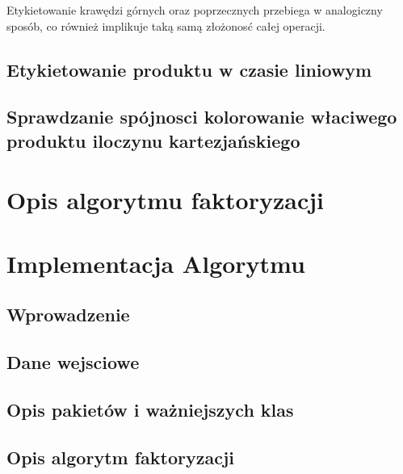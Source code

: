 \documentclass[12pt,a4paper,titlepage]{article}
\begin{document}
\begin{enumerate}
Etykietowanie krawędzi górnych oraz poprzecznych przebiega w analogiczny sposób, co również implikuje taką samą złożonosć całej operacji.\\
\end{enumerate}

\subsection{Etykietowanie produktu w czasie liniowym}
\subsection{Sprawdzanie spójnosci kolorowanie właciwego produktu iloczynu kartezjańskiego}
\section{Opis algorytmu faktoryzacji}
\section{Implementacja Algorytmu}
\subsection{Wprowadzenie}
\subsection{Dane wejsciowe}
\subsection{Opis pakietów i ważniejszych klas}
\subsection{Opis algorytm faktoryzacji}
\end{document}
